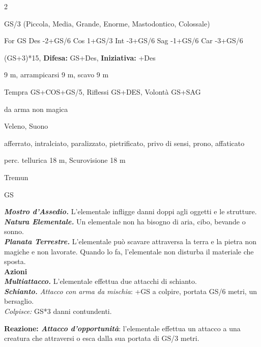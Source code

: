 \begin{multicols}{2}
{
\begin{description}[noitemsep, topsep=0pt, parsep=0pt, partopsep=0pt, itemsep=1pt, leftmargin=2.35cm,  labelwidth=2.2cm, itemindent=0cm, listparindent=0pt] %
\setlength{\baselineskip}{10pt}
\item[\textbf{Taglia/Tipo}] GS/3 (Piccola, Media, Grande, Enorme, Mastodontico, Colossale)
\item[\textbf{Caratt.}] For GS Des -2+GS/6 Cos 1+GS/3 Int -3+GS/6 Sag -1+GS/6 Car -3+GS/6
\item[\textbf{Punti Ferita}] (GS+3)*15, \textbf{Difesa:} GS+Des, \textbf{Iniziativa:} +Des
\item[\textbf{Movimento}] 9 m, arrampicarsi 9 m, scavo 9 m
\item[\textbf{Tiri Salvez.}] Tempra GS+COS+GS/5, Riflessi GS+DES, Volontà GS+SAG
\item[\textbf{Res. Danni}] da arma non magica
\item[\textbf{Imm. Danni}] Veleno, Suono
\item[\textbf{Immunità}] afferrato, intralciato, paralizzato, pietrificato, privo di sensi, prono, affaticato
\item[\textbf{Sensi}] perc. tellurica 18 m, Scurovisione 18 m
\item[\textbf{Linguaggi}] Tremun
\item[\textbf{Sfida}] GS \\
\end{description}

\emph{\textbf{Mostro d'Assedio.}} L'elementale infligge danni doppi agli oggetti e le strutture.\\
\emph{\textbf{Natura Elementale.}} Un elementale non ha bisogno di aria, cibo, bevande o sonno.\\
\emph{\textbf{Planata Terrestre.}} L'elementale può scavare attraversa la terra e la pietra non magiche e non lavorate. Quando lo fa, l'elementale non disturba il materiale che sposta.\\
\textbf{Azioni}\\
\emph{\textbf{Multiattacco.}} L'elementale effettua due attacchi di schianto.\\
\emph{\textbf{Schianto.} Attacco con arma da mischia}: +GS a colpire, portata GS/6 metri, un bersaglio.\\
\emph{Colpisce:} GS*3 danni contundenti.

\textbf{Reazione: \emph{Attacco d'opportunità}}: l'elementale effettua un attacco a una creatura che attraversi o esca dalla sua portata di GS/3 metri.


}
\end{multicols}
